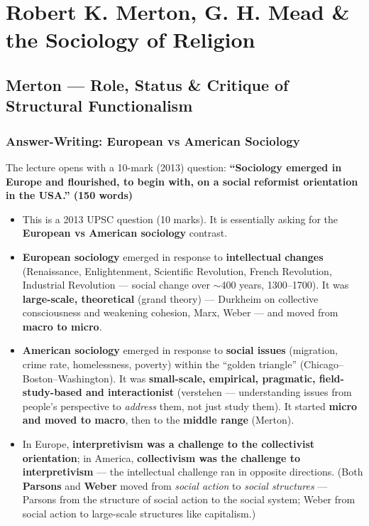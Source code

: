 \chapter{Robert K. Merton, G. H. Mead \& the Sociology of Religion}

\section{Merton --- Role, Status \& Critique of Structural Functionalism}

\subsection{Answer-Writing: European vs American Sociology}

The lecture opens with a 10-mark (2013) question: \textbf{``Sociology emerged in Europe and flourished, to begin with, on a social reformist orientation in the USA.'' (150 words)}

\begin{PYQLink}
\begin{itemize}
\item This is a 2013 UPSC question (10 marks). It is essentially asking for the \textbf{European vs American sociology} contrast.
\end{itemize}
\end{PYQLink}

\begin{ComparisonBox}
\begin{itemize}
\item \textbf{European sociology} emerged in response to \textbf{intellectual changes} (Renaissance, Enlightenment, Scientific Revolution, French Revolution, Industrial Revolution --- social change over $\sim$400 years, 1300--1700). It was \textbf{large-scale, theoretical} (grand theory) --- Durkheim on collective consciousness and weakening cohesion, Marx, Weber --- and moved from \textbf{macro to micro}.
\item \textbf{American sociology} emerged in response to \textbf{social issues} (migration, crime rate, homelessness, poverty) within the ``golden triangle'' (Chicago--Boston--Washington). It was \textbf{small-scale, empirical, pragmatic, field-study-based and interactionist} (verstehen --- understanding issues from people's perspective to \textit{address} them, not just study them). It started \textbf{micro and moved to macro}, then to the \textbf{middle range} (Merton).
\item In Europe, \textbf{interpretivism was a challenge to the collectivist orientation}; in America, \textbf{collectivism was the challenge to interpretivism} --- the intellectual challenge ran in opposite directions. (Both \textbf{Parsons} and \textbf{Weber} moved from \textit{social action} to \textit{social structures} --- Parsons from the structure of social action to the social system; Weber from social action to large-scale structures like capitalism.)
\end{itemize}
\end{ComparisonBox}

